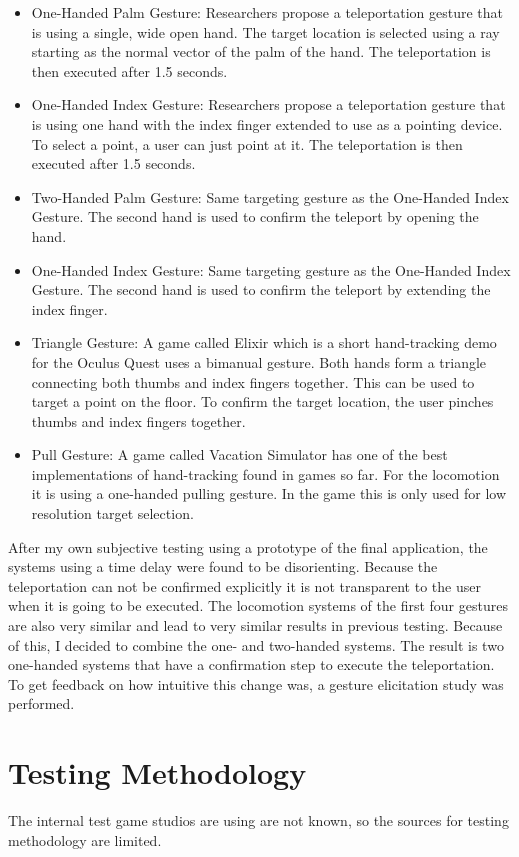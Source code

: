 \begin{itemize}
    \item One-Handed Palm Gesture: %
    Researchers propose a teleportation gesture that is using a single, wide open hand. The target location is selected using a ray starting as the normal vector of the palm of the hand. The teleportation is then executed after 1.5 seconds.

    \item One-Handed Index Gesture: %
    Researchers propose a teleportation gesture that is using one hand with the index finger extended to use as a pointing device. To select a point, a user can just point at it. The teleportation is then executed after 1.5 seconds.
    
    \item Two-Handed Palm Gesture: %
    Same targeting gesture as the One-Handed Index Gesture. The second hand is used to confirm the teleport by opening the hand.

    \item One-Handed Index Gesture: %
    Same targeting gesture as the One-Handed Index Gesture. The second hand is used to confirm the teleport by extending the index finger.

    \item Triangle Gesture: %
    A game called Elixir which is a short hand-tracking demo for the Oculus Quest uses a bimanual gesture. Both hands form a triangle connecting both thumbs and index fingers together. This can be used to target a point on the floor. To confirm the target location, the user pinches thumbs and index fingers together.
    
    \item Pull Gesture: %
    A game called Vacation Simulator has one of the best implementations of hand-tracking found in games so far. For the locomotion it is using a one-handed pulling gesture. In the game this is only used for low resolution target selection. 

\end{itemize}

After my own subjective testing using a prototype of the final application, the systems using a time delay were found to be disorienting. Because the teleportation can not be confirmed explicitly it is not transparent to the user when it is going to be executed. The locomotion systems of the first four gestures are also very similar and lead to very similar results in previous testing. Because of this, I decided to combine the one- and two-handed systems. The result is two one-handed systems that have a confirmation step to execute the teleportation. To get feedback on how intuitive this change was, a gesture elicitation study was performed. 

\section{Testing Methodology}
The internal test game studios are using are not known, so the sources for testing methodology are limited. 